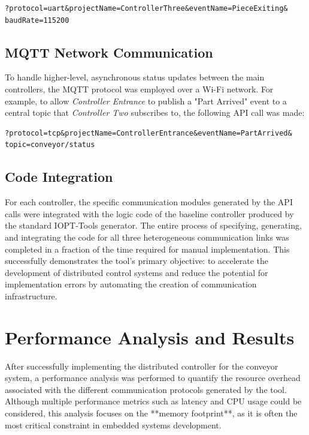 \begin{verbatim}
?protocol=uart&projectName=ControllerThree&eventName=PieceExiting&
baudRate=115200
\end{verbatim}

\subsection{MQTT Network Communication}
To handle higher-level, asynchronous status updates between the main controllers, the MQTT protocol was employed over a Wi-Fi network. For example, to allow \textit{Controller Entrance} to publish a "Part Arrived" event to a central topic that \textit{Controller Two} subscribes to, the following API call was made:

\begin{verbatim}
?protocol=tcp&projectName=ControllerEntrance&eventName=PartArrived&
topic=conveyor/status
\end{verbatim}

\subsection{Code Integration}
For each controller, the specific communication modules generated by the API calls were integrated with the logic code of the baseline controller produced by the standard IOPT-Tools generator. The entire process of specifying, generating, and integrating the code for all three heterogeneous communication links was completed in a fraction of the time required for manual implementation. This successfully demonstrates the tool's primary objective: to accelerate the development of distributed control systems and reduce the potential for implementation errors by automating the creation of communication infrastructure.



\section{Performance Analysis and Results}
\label{sec:performance_analysis}

After successfully implementing the distributed controller for the conveyor system, a performance analysis was performed to quantify the resource overhead associated with the different communication protocols generated by the tool. Although multiple performance metrics such as latency and CPU usage could be considered, this analysis focuses on the **memory footprint**, as it is often the most critical constraint in embedded systems development.

